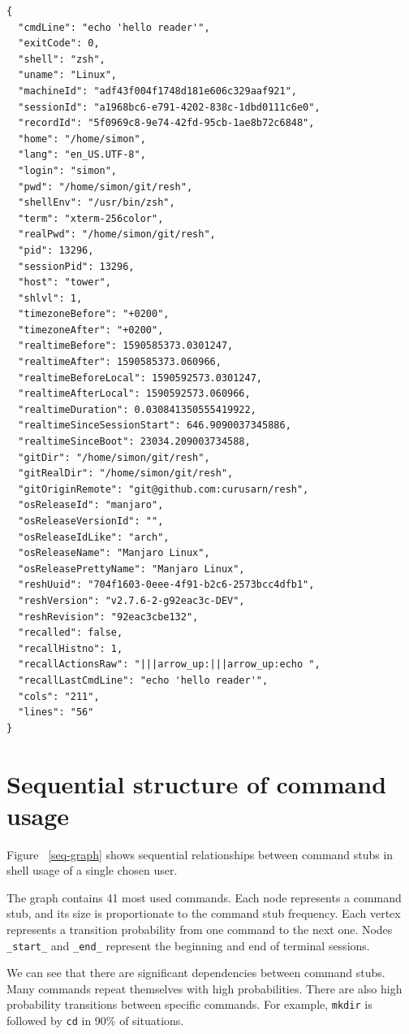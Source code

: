 \documentclass[thesis=M,english]{FITthesis}[2012/10/20]
\let\myRef\ref
\renewcommand\ref{\unskip~\myRef}
\begin{document}
\begin{verbatim}
{
  "cmdLine": "echo 'hello reader'",
  "exitCode": 0,
  "shell": "zsh",
  "uname": "Linux",
  "machineId": "adf43f004f1748d181e606c329aaf921",
  "sessionId": "a1968bc6-e791-4202-838c-1dbd0111c6e0",
  "recordId": "5f0969c8-9e74-42fd-95cb-1ae8b72c6848",
  "home": "/home/simon",
  "lang": "en_US.UTF-8",
  "login": "simon",
  "pwd": "/home/simon/git/resh",
  "shellEnv": "/usr/bin/zsh",
  "term": "xterm-256color",
  "realPwd": "/home/simon/git/resh",
  "pid": 13296,
  "sessionPid": 13296,
  "host": "tower",
  "shlvl": 1,
  "timezoneBefore": "+0200",
  "timezoneAfter": "+0200",
  "realtimeBefore": 1590585373.0301247,
  "realtimeAfter": 1590585373.060966,
  "realtimeBeforeLocal": 1590592573.0301247,
  "realtimeAfterLocal": 1590592573.060966,
  "realtimeDuration": 0.030841350555419922,
  "realtimeSinceSessionStart": 646.9090037345886,
  "realtimeSinceBoot": 23034.209003734588,
  "gitDir": "/home/simon/git/resh",
  "gitRealDir": "/home/simon/git/resh",
  "gitOriginRemote": "git@github.com:curusarn/resh",
  "osReleaseId": "manjaro",
  "osReleaseVersionId": "",
  "osReleaseIdLike": "arch",
  "osReleaseName": "Manjaro Linux",
  "osReleasePrettyName": "Manjaro Linux",
  "reshUuid": "704f1603-0eee-4f91-b2c6-2573bcc4dfb1",
  "reshVersion": "v2.7.6-2-g92eac3c-DEV",
  "reshRevision": "92eac3cbe132",
  "recalled": false,
  "recallHistno": 1,
  "recallActionsRaw": "|||arrow_up:|||arrow_up:echo ",
  "recallLastCmdLine": "echo 'hello reader'",
  "cols": "211",
  "lines": "56"
}
\end{verbatim}

\section{Sequential structure of command usage}\label{seq-app}

Figure \ref{seq-graph} shows sequential relationships between command stubs in shell usage of a single chosen user. 

The graph contains 41 most used commands. Each node represents a command stub, and its size is proportionate to the command stub frequency. Each vertex represents a transition probability from one command to the next one. Nodes \verb|_start_| and \verb|_end_| represent the beginning and end of terminal sessions.

We can see that there are significant dependencies between command stubs. Many commands repeat themselves with high probabilities. There are also high probability transitions between specific commands. For example, \verb|mkdir| is followed by \verb|cd| in 90\% of situations.
\end{document}
